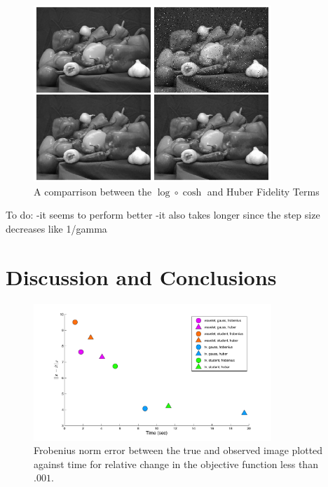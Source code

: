 \documentclass[10pt,a4paper]{article}
\begin{document}
	\begin{figure}[H]
		\begin{center}
			\includegraphics[width=0.8\textwidth]{../figures/logcosh_peppers.png}
			\caption{A comparrison between the $\log \circ \cosh$ and Huber Fidelity Terms }
			\label{log_cosh_pic}
		\end{center}
	\end{figure}
	
	To do:
	-it seems to perform better
	-it also takes longer since the step size decreases like 1/gamma
	
	\section{Discussion and Conclusions}
	
	\begin{figure}[H]
		
		\begin{center}
			\includegraphics[width=0.8\textwidth]{../figures/comparePlot2.pdf}
			\caption{ Frobenius norm error between the true and observed image plotted against time for relative change in the objective function less than $.001$. }
			\label{comp_methods}
		\end{center}
	\end{figure}
	
\end{document}

